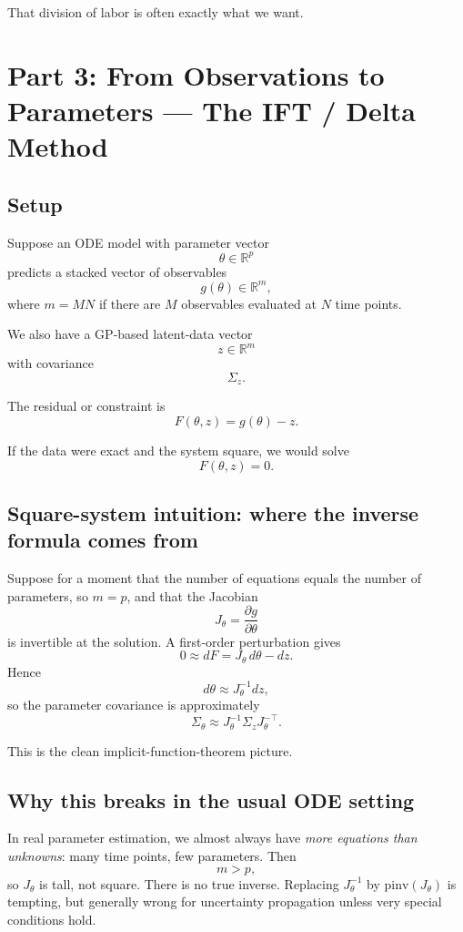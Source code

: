 \documentclass[11pt]{article}
\begin{document}
That division of labor is often exactly what we want.

\section{Part 3: From Observations to Parameters --- The IFT / Delta Method}

\subsection*{Setup}
Suppose an ODE model with parameter vector
\[
\theta \in \mathbb{R}^p
\]
predicts a stacked vector of observables
\[
g(\theta) \in \mathbb{R}^{m},
\]
where $m = MN$ if there are $M$ observables evaluated at $N$ time points.

We also have a GP-based latent-data vector
\[
z \in \mathbb{R}^{m}
\]
with covariance
\[
\Sigma_z.
\]

The residual or constraint is
\[
F(\theta,z) = g(\theta) - z.
\]

If the data were exact and the system square, we would solve
\[
F(\theta,z)=0.
\]

\subsection*{Square-system intuition: where the inverse formula comes from}
Suppose for a moment that the number of equations equals the number of parameters, so $m=p$, and that the Jacobian
\[
J_\theta = \frac{\partial g}{\partial \theta}
\]
is invertible at the solution. A first-order perturbation gives
\[
0 \approx dF = J_\theta\, d\theta - dz.
\]
Hence
\[
d\theta \approx J_\theta^{-1} dz,
\]
so the parameter covariance is approximately
\[
\Sigma_\theta \approx J_\theta^{-1}\Sigma_z J_\theta^{-\top}.
\]

This is the clean implicit-function-theorem picture.

\subsection*{Why this breaks in the usual ODE setting}
In real parameter estimation, we almost always have \emph{more equations than unknowns}: many time points, few parameters. Then
\[
m > p,
\]
so $J_\theta$ is tall, not square. There is no true inverse. Replacing $J_\theta^{-1}$ by $\mathrm{pinv}(J_\theta)$ is tempting, but generally wrong for uncertainty propagation unless very special conditions hold.
\end{document}
